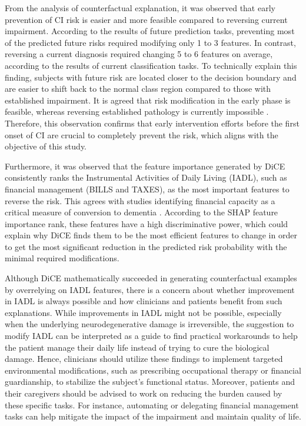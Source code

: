 From the analysis of counterfactual explanation, it was observed that early prevention of CI risk is easier and more feasible compared to reversing current impairment. According to the results of future prediction tasks, preventing most of the predicted future risks required modifying only 1 to 3 features. In contrast, reversing a current diagnosis required changing 5 to 6 features on average, according to the results of current classification tasks. To technically explain this finding, subjects with future risk are located closer to the decision boundary and are easier to shift back to the normal class region compared to those with established impairment. It is agreed that risk modification in the early phase is feasible, whereas reversing established pathology is currently impossible \cite{Livingston2020Dementia}. Therefore, this observation confirms that early intervention efforts before the first onset of CI are crucial to completely prevent the risk, which aligns with the objective of this study.

Furthermore, it was observed that the feature importance generated by DiCE consistently ranks the Instrumental Activities of Daily Living (IADL), such as financial management (BILLS and TAXES), as the most important features to reverse the risk. This agrees with studies identifying financial capacity as a critical measure of conversion to dementia \cite{Jekel2015Mild}. According to the SHAP feature importance rank, these features have a high discriminative power, which could explain why DiCE finds them to be the most efficient features to change in order to get the most significant reduction in the predicted risk probability with the minimal required modifications.

Although DiCE mathematically succeeded in generating counterfactual examples by overrelying on IADL features, there is a concern about whether improvement in IADL is always possible and how clinicians and patients benefit from such explanations. While improvements in IADL might not be possible, especially when the underlying neurodegenerative damage is irreversible, the suggestion to modify IADL can be interpreted as a guide to find practical workarounds to help the patient manage their daily life instead of trying to cure the biological damage. Hence, clinicians should utilize these findings to implement targeted environmental modifications, such as prescribing occupational therapy or financial guardianship, to stabilize the subject's functional status. Moreover, patients and their caregivers should be advised to work on reducing the burden caused by these specific tasks. For instance, automating or delegating financial management tasks can help mitigate the impact of the impairment and maintain quality of life.


